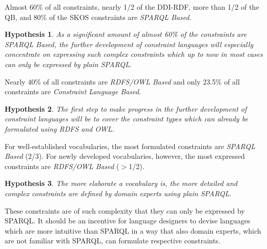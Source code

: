 \documentclass[conference]{IEEEtran}
\newtheorem{hyp}{Hypothesis}
\begin{document}
Almost 60\% of all constraints, nearly 1/2 of the DDI-RDF, more than 1/2 of the QB, and 80\% of the SKOS constraints are \emph{SPARQL Based}.
\begin{hyp}
As a significant amount of almost 60\% of the constraints are \emph{SPARQL Based},
the further development of constraint languages will especially concentrate on expressing such complex constraints which up to now in most cases can only be expressed by plain SPARQL. 
\end{hyp} 

Nearly 40\% of all constraints are \emph{RDFS/OWL Based} and only 23.5\% of all constraints are \emph{Constraint Language Based}.

\begin{hyp}
The first step to make progress in the further development of constraint languages will be to cover the constraint types which can already be formulated using RDFS and OWL.
\end{hyp} 

For well-established vocabularies, the most formulated constraints are \emph{SPARQL Based} (2/3). For newly developed vocabularies, however, the most expressed constraints are \emph{RDFS/OWL Based} ($>$1/2).

\begin{hyp}
The more elaborate a vocabulary is, the more detailed and complex constraints are defined by domain experts using plain SPARQL.
\end{hyp} 

These constraints are of such complexity that they can only be expressed by SPARQL. It should be an incentive for language designers to devise languages which are more intuitive than SPARQL in a way that also domain experts, which are not familiar with SPARQL, can formulate respective constraints.
\end{document}

